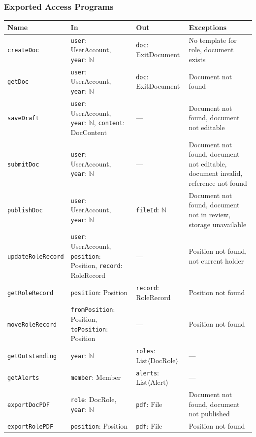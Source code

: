 \documentclass[12pt, titlepage]{article}
\begin{document}
\subsubsection{Exported Access Programs}
\begin{tabularx}{\textwidth}{p{3.6cm} p{4.4cm} p{2.6cm} X}
\toprule
\textbf{Name} & \textbf{In} & \textbf{Out} & \textbf{Exceptions} \\
\midrule
\texttt{createDoc} & \texttt{user}: UserAccount, \texttt{year}: $\mathbb{N}$ & \texttt{doc}: ExitDocument & No template for role, document exists \\
\texttt{getDoc} & \texttt{user}: UserAccount, \texttt{year}: $\mathbb{N}$ & \texttt{doc}: ExitDocument & Document not found \\
\texttt{saveDraft} & \texttt{user}: UserAccount, \texttt{year}: $\mathbb{N}$, \texttt{content}: DocContent & --- & Document not found, document not editable \\
\texttt{submitDoc} & \texttt{user}: UserAccount, \texttt{year}: $\mathbb{N}$ & --- & Document not found, document not editable, document invalid, reference not found \\
\texttt{publishDoc} & \texttt{user}: UserAccount, \texttt{year}: $\mathbb{N}$ & \texttt{fileId}: $\mathbb{N}$ & Document not found, document not in review, storage unavailable \\
\texttt{updateRoleRecord} & \texttt{user}: UserAccount, \texttt{position}: Position, \texttt{record}: RoleRecord & --- & Position not found, not current holder \\
\texttt{getRoleRecord} & \texttt{position}: Position & \texttt{record}: RoleRecord & Position not found \\
\texttt{moveRoleRecord} & \texttt{fromPosition}: Position, \texttt{toPosition}: Position & --- & Position not found \\
\texttt{getOutstanding} & \texttt{year}: $\mathbb{N}$ & \texttt{roles}: $\text{List}\langle \text{DocRole} \rangle$ & --- \\
\texttt{getAlerts} & \texttt{member}: Member & \texttt{alerts}: $\text{List}\langle \text{Alert} \rangle$ & --- \\
\texttt{exportDocPDF} & \texttt{role}: DocRole, \texttt{year}: $\mathbb{N}$ & \texttt{pdf}: File & Document not found, document not published \\
\texttt{exportRolePDF} & \texttt{position}: Position & \texttt{pdf}: File & Position not found \\
\bottomrule
\end{tabularx}
\end{document}
